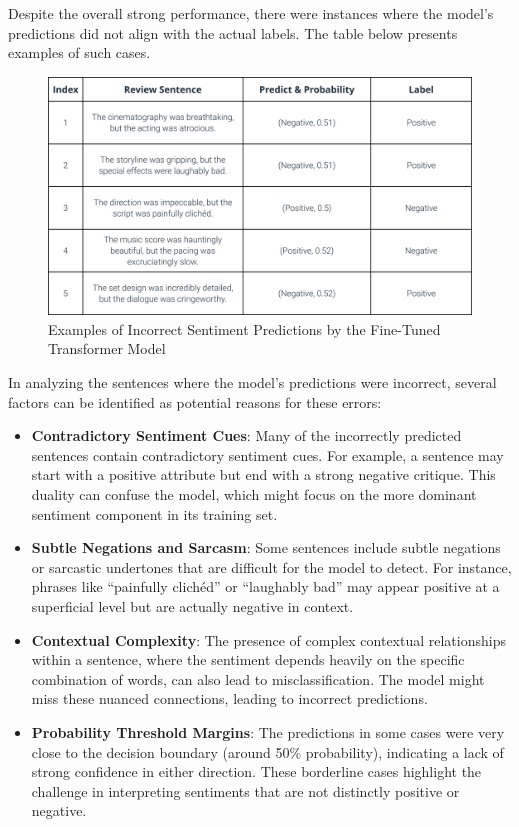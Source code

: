\documentclass{article}
\begin{document}
Despite the overall strong performance, there were instances where the model's predictions did not align with the actual labels. The table below presents examples of such cases.
\begin{figure}[H]
    \centering
    \includegraphics[width=\textwidth]{figs/wrong.png}
    \caption{Examples of Incorrect Sentiment Predictions by the Fine-Tuned Transformer Model}
    \label{fig:wrong-predictions}
\end{figure}

In analyzing the sentences where the model's predictions were incorrect, several factors can be identified as potential reasons for these errors:
\begin{itemize}
    \item \textbf{Contradictory Sentiment Cues}: Many of the incorrectly predicted sentences contain contradictory sentiment cues. For example, a sentence may start with a positive attribute but end with a strong negative critique. This duality can confuse the model, which might focus on the more dominant sentiment component in its training set.
    \item \textbf{Subtle Negations and Sarcasm}: Some sentences include subtle negations or sarcastic undertones that are difficult for the model to detect. For instance, phrases like “painfully clichéd” or “laughably bad” may appear positive at a superficial level but are actually negative in context.
    \item \textbf{Contextual Complexity}: The presence of complex contextual relationships within a sentence, where the sentiment depends heavily on the specific combination of words, can also lead to misclassification. The model might miss these nuanced connections, leading to incorrect predictions.
    \item \textbf{Probability Threshold Margins}: The predictions in some cases were very close to the decision boundary (around 50\% probability), indicating a lack of strong confidence in either direction. These borderline cases highlight the challenge in interpreting sentiments that are not distinctly positive or negative.
\end{itemize}
\end{document}
